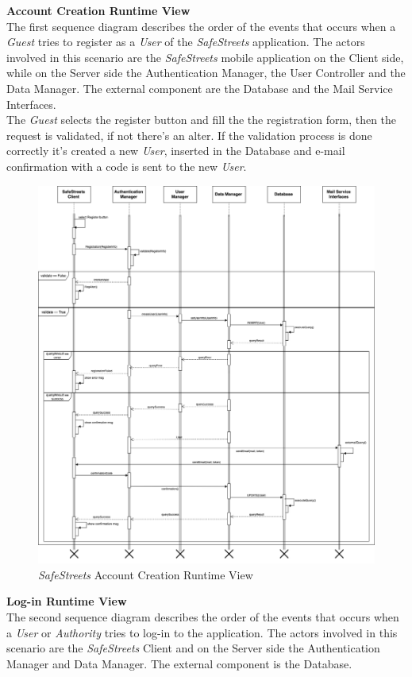 \documentclass{article}
\begin{document}
	{\bf Account Creation Runtime View} \\
	The first sequence diagram describes the order of the events that occurs when a {\it Guest} tries to register as a {\it User} of the {\it SafeStreets} application. The actors involved in this scenario are the {\it SafeStreets}  mobile application on the Client side, while on the Server side the Authentication Manager, the User Controller and the Data Manager. The external component are the Database and the Mail Service Interfaces. \\
	The {\it Guest} selects the register button and fill the the registration form, then the request is validated, if not there's an alter. If the validation process is done correctly it's created a new {\it User}, inserted in the Database and e-mail confirmation with a code is sent to the new {\it User}.
	\begin{figure}[H]
			\centering
			\includegraphics[scale=0.26]{Images/Diagrams/Runtime/registration_runtime.png}
			\caption{{\it SafeStreets} Account Creation Runtime View}
	\end{figure}	
	\pagebreak
	\noindent
	{\bf Log-in Runtime View} \\
	The second sequence diagram describes the order of the events that occurs when a {\it User} or {\it Authority} tries to log-in to the application. The actors involved in this scenario are the {\it SafeStreets} Client and on the Server side the Authentication Manager and Data Manager. The external component is the Database. \\ 
\end{document}
